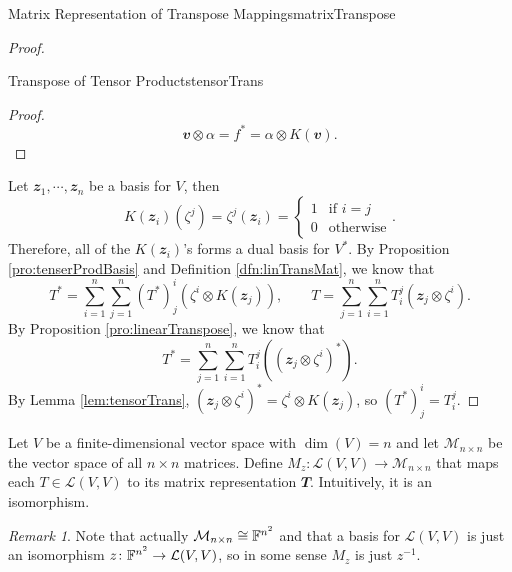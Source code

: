 \documentclass[math]{amznotes}
\theoremstyle{remark}
\newtheorem*{remark}{Remark}
\begin{document}
\begin{probox}{Matrix Representation of Transpose Mappings}{matrixTranspose}
\begin{proof}
\begin{lembox}{Transpose of Tensor Products}{tensorTrans}
\begin{proof}
\begin{equation*}
                    \mathbfit{v} \otimes \alpha = f^* = \alpha \otimes K(\mathbfit{v}).
                \end{equation*}
            \end{proof}
        \end{lembox}
        Let $\mathbfit{z}_1, \cdots, \mathbfit{z}_n$ be a basis for $V$, then 
        \begin{equation*}
            K(\mathbfit{z}_i)\left(\zeta^j\right) = \zeta^j(\mathbfit{z}_i) = \begin{cases}
                1 & \textrm{if } i = j \\
                0 & \textrm{otherwise}
            \end{cases}.
        \end{equation*}
        Therefore, all of the $K(\mathbfit{z}_i)$'s forms a dual basis for $V^*$. By Proposition \ref{pro:tenserProdBasis} and Definition \ref{dfn:linTransMat}, we know that 
        \begin{equation*}
            T^* = \sum_{i = 1}^{n}\sum_{j = 1}^{n}\left(T^*\right)^i_j\left(\zeta^i \otimes K(\mathbfit{z}_j)\right), \qquad T = \sum_{j = 1}^{n}\sum_{i = 1}^{n}T^j_i\left(\mathbfit{z}_j \otimes \zeta^i\right).
        \end{equation*}
        By Proposition \ref{pro:linearTranspose}, we know that 
        \begin{equation*}
            T^* = \sum_{j = 1}^{n}\sum_{i = 1}^{n}T^j_i\left(\left(\mathbfit{z}_j \otimes \zeta^i\right)^*\right).
        \end{equation*}
        By Lemma \ref{lem:tensorTrans}, $\left(\mathbfit{z}_j \otimes \zeta^i\right)^* = \zeta^i \otimes K(\mathbfit{z}_j)$, so $\left(T^*\right)^i_j = T^j_i$. 
    \end{proof}
\end{probox}
Let $V$ be a finite-dimensional vector space with $\dim(V) = n$ and let $\mathcal{M}_{n \times n}$ be the vector space of all $n \times n$ matrices. Define $M_z \colon \mathcal{L}(V, V) \to \mathcal{M}_{n \times n}$ that maps each $T \in \mathcal{L}(V, V)$ to its matrix representation $\mathbfit{T}$. Intuitively, it is an isomorphism.

\begin{notebox}
    \begin{remark}
        Note that actually $\mathcal{M}_{n \times n} \cong \mathbb{F}^{n^2}$ and that a basis for $\mathcal{L}(V, V)$ is just an isomorphism $z \colon \mathbb{F}^{n^2} \to \mathcal{L}(V, V)$, so in some sense $M_z$ is just $z^{-1}$.
    \end{remark}
\end{notebox}
\end{document}
